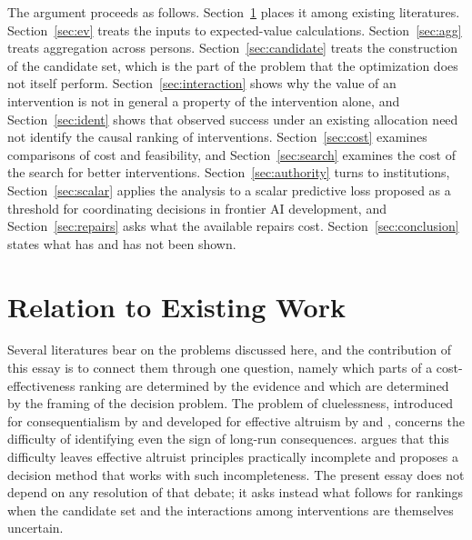 \documentclass[11pt]{article}
\theoremstyle{definition}
\theoremstyle{remark}
\begin{document}
The argument proceeds as follows. Section~\ref{sec:related} places it among existing literatures. Section~\ref{sec:ev} treats the inputs to expected-value calculations. Section~\ref{sec:agg} treats aggregation across persons. Section~\ref{sec:candidate} treats the construction of the candidate set, which is the part of the problem that the optimization does not itself perform. Section~\ref{sec:interaction} shows why the value of an intervention is not in general a property of the intervention alone, and Section~\ref{sec:ident} shows that observed success under an existing allocation need not identify the causal ranking of interventions. Section~\ref{sec:cost} examines comparisons of cost and feasibility, and Section~\ref{sec:search} examines the cost of the search for better interventions. Section~\ref{sec:authority} turns to institutions, Section~\ref{sec:scalar} applies the analysis to a scalar predictive loss proposed as a threshold for coordinating decisions in frontier AI development, and Section~\ref{sec:repairs} asks what the available repairs cost. Section~\ref{sec:conclusion} states what has and has not been shown.

\section{Relation to Existing Work}
\label{sec:related}

Several literatures bear on the problems discussed here, and the contribution of this essay is to connect them through one question, namely which parts of a cost-effectiveness ranking are determined by the evidence and which are determined by the framing of the decision problem. The problem of cluelessness, introduced for consequentialism by \citet{lenman2000} and developed for effective altruism by \citet{greaves2016} and \citet{mogensen2021}, concerns the difficulty of identifying even the sign of long-run consequences. \citet{herlitz2019} argues that this difficulty leaves effective altruist principles practically incomplete and proposes a decision method that works with such incompleteness. The present essay does not depend on any resolution of that debate; it asks instead what follows for rankings when the candidate set and the interactions among interventions are themselves uncertain.
\end{document}
